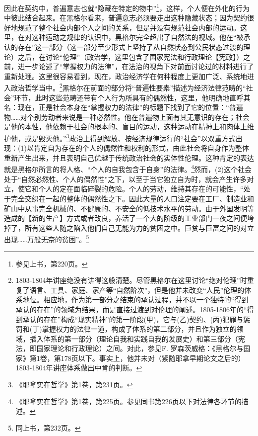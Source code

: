 因此在契约中，普遍意志也就“隐藏在特定的物中”\footnote{参见上书，第220页。}，这样，个人便在外化的行为中彼此结合起来。在黑格尔看来，普遍意志必须要走出这种隐藏状态；因为契约很好地规范了整个社会内部个人之间的关系，但是并没有规范社会内部的运动。这里，在对这种运动之规律的认识中，黑格尔完全超出了自然法的视域。他在“被承认的存在”这一部分（这一部分至少形式上坚持了从自然状态到公民状态过渡的理论）之后，在讨论“伦理”（政治学，这里包含了国家宪法和行政理论【宪政】）之前，进一步论述了“掌握权力的法律”，在法治的视角下对前面讨论过的材料进行了重新处理。这里很容易看到，现在，政治经济学在何种程度上更加广泛、系统地进入政治哲学当中。\footnote{1803-1804年讲座绝没有讲得这般清楚。尽管黑格尔在这里讨论“绝对伦理”时重复了语言、工具、家庭、家产等“自然阶次”，但是他并未改变“人民”伦理的体系地位。相应地，作为第一部分之结束的承认过程，并不以一个独特的“得到承认的存在”的领域为结果，而是直接过渡到对伦理的阐述。1805-1806年的“得到承认的存在”构成“现实精神”的第一阶段(甲)，它与(乙)契约、(丙)犯罪与惩罚和(丁)掌握权力的法律一道，构成了体系的第二部分，并且作为独立的领域，插入体系的第一部分（理论自我和实践自我的发展史）和第三部分（宪法，即国家理论和行政理论）之间。对此，参见F. 罗森茨威格：《黑格尔与国家》第1卷，第178页以下。事实上，他并未对（紧随耶拿早期论文之后的）1803-1804年讲座体系做出中肯的判断。}黑格尔在前面的部分将“普遍性要素”描述为经济法律范畴的“社会”环节，此时这些范畴还带有个人行为所具有的偶然性，这里，他明确地直呼其名：现在，正是社会本身在“掌握权力的法律”的标题下找到了它的位置：“普遍物……对个别劳动者来说是一种必然性。他在普遍物上面有其无意识的存在；社会是他的本性，他依赖于社会的根本的、盲目的运动，这种运动在精神上和肉体上维护他，或是毁灭他。”\footnote{《耶拿实在哲学》第1卷，第231页。}政治上得到解放、按经济规律运行的“社会”以双重方式出现：(1)以肯定自为存在的个人的偶然性和权利的形式，由此社会将自身作为整体重新产生出来，并且表明自己优越于传统政治社会的实体性伦理。这种肯定的表达就是黑格尔所言的将人格、“个人的自我包含于自身”的法律。\footnote{《耶拿实在哲学》第1卷，第225页。参见同书第226页以下对法律各环节的描述。}然而，(2)这个社会处于“自然必然性、个人的偶然性”之下，以至于当它独立自为时，就会产生许多对立，使它和个人的定在面临碎裂的危险。个人的劳动，维持其存在的可能性，“处于完全交织在一起的整体的偶然性之下。因此大量的人口注定要在工厂、制造业和矿山中从事完全机械的、不健康的、不安全的低技术水平的劳动。由于外国发明等造成的【新的生产】方式或者改良，养活了一个大的阶级的工业部门一夜之间便垮掉了，所有这些人随之陷入他们自己无能为力的贫困之中。巨贫与巨富之间的对立出现……万般无奈的贫困”。\footnote{同上书，第232页。}

